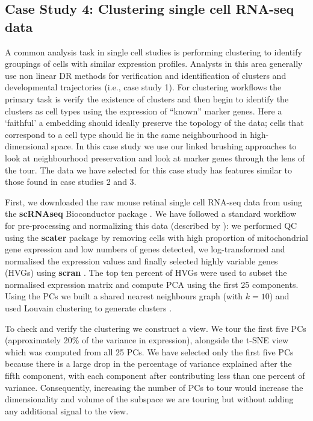 \documentclass[article,notitle]{jdssv}
\begin{document}
\hypertarget{case-study-4-clustering-single-cell-rna-seq-data}{%
\subsection{Case Study 4: Clustering single cell RNA-seq data}\label{case-study-4-clustering-single-cell-rna-seq-data}}

A common analysis task in single cell studies is performing clustering to
identify groupings of cells with similar expression profiles. Analysts
in this area generally use non linear DR methods for verification and identification
of clusters and developmental trajectories (i.e., case study 1). For clustering
workflows the primary task is verify the existence of clusters and then begin to
identify the clusters as cell types using the expression of ``known''
marker genes. Here a `faithful' a embedding should ideally preserve the topology
of the data; cells that correspond to a cell type should lie in the same
neighbourhood in high-dimensional space. In this case study we use our
linked brushing approaches to look at neighbourhood preservation
and look at marker genes through the lens of the tour. The data we have
selected for this case study has features similar to those found in case studies
2 and 3.

First, we downloaded the raw mouse retinal single cell RNA-seq data from
\citet{Macosko2015-ot} using the \textbf{scRNAseq} Bioconductor package \citep{scRNAseq-d}. We
have followed a standard workflow for pre-processing and normalizing this data
(described by \citet{Amezquita2020-at}): we performed QC using the \textbf{scater} package
by removing cells with high proportion of mitochondrial gene expression and low
numbers of genes detected, we log-transformed and normalised the expression
values and finally selected highly variable genes (HVGs) using \textbf{scran}
\citep{McCarthy2017, Lun2016}. The top ten percent of HVGs were used to subset
the normalised expression matrix and compute PCA using the first 25 components.
Using the PCs we built a shared nearest neighbours graph (with \(k = 10\)) and
used Louvain clustering to generate clusters \citep{Blondel2008-bx}.

To check and verify the clustering we construct a  view.
We tour the first five PCs (approximately 20\% of the variance in expression),
alongside the t-SNE view which was computed from all 25 PCs. We have selected only the first five PCs because there is a large drop in the percentage of variance explained after the fifth component, with each component after contributing less than one percent of variance.
Consequently, increasing the number of PCs to tour would increase the dimensionality and volume of the subspace we are touring but without adding any additional signal to the view.
\end{document}
